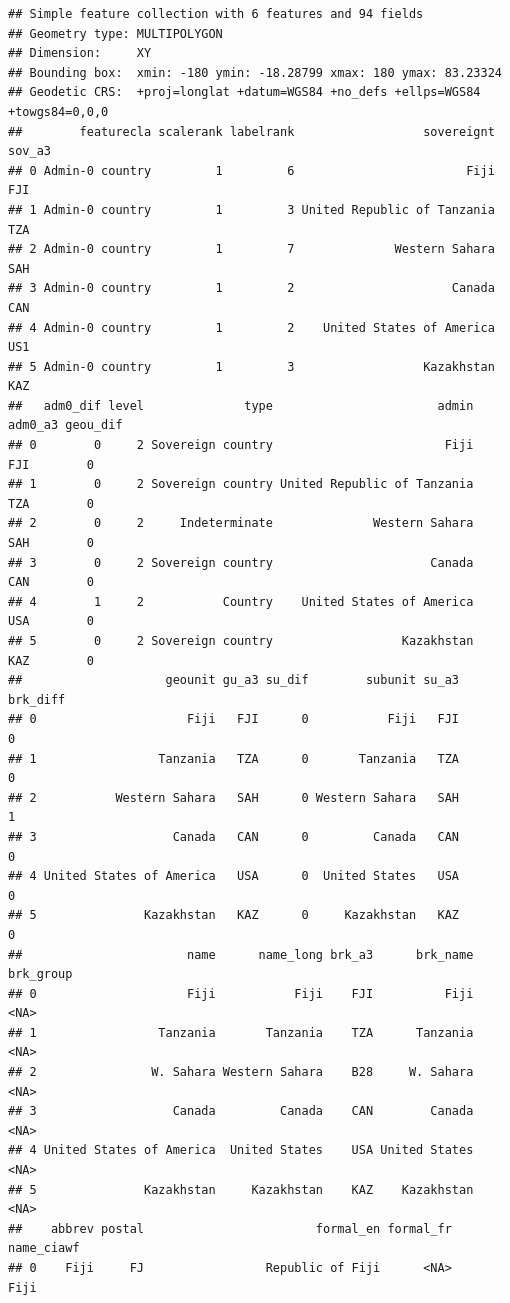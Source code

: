 \documentclass[
]{article}
\begin{document}
\begin{verbatim}
## Simple feature collection with 6 features and 94 fields
## Geometry type: MULTIPOLYGON
## Dimension:     XY
## Bounding box:  xmin: -180 ymin: -18.28799 xmax: 180 ymax: 83.23324
## Geodetic CRS:  +proj=longlat +datum=WGS84 +no_defs +ellps=WGS84 +towgs84=0,0,0
##        featurecla scalerank labelrank                  sovereignt sov_a3
## 0 Admin-0 country         1         6                        Fiji    FJI
## 1 Admin-0 country         1         3 United Republic of Tanzania    TZA
## 2 Admin-0 country         1         7              Western Sahara    SAH
## 3 Admin-0 country         1         2                      Canada    CAN
## 4 Admin-0 country         1         2    United States of America    US1
## 5 Admin-0 country         1         3                  Kazakhstan    KAZ
##   adm0_dif level              type                       admin adm0_a3 geou_dif
## 0        0     2 Sovereign country                        Fiji     FJI        0
## 1        0     2 Sovereign country United Republic of Tanzania     TZA        0
## 2        0     2     Indeterminate              Western Sahara     SAH        0
## 3        0     2 Sovereign country                      Canada     CAN        0
## 4        1     2           Country    United States of America     USA        0
## 5        0     2 Sovereign country                  Kazakhstan     KAZ        0
##                    geounit gu_a3 su_dif        subunit su_a3 brk_diff
## 0                     Fiji   FJI      0           Fiji   FJI        0
## 1                 Tanzania   TZA      0       Tanzania   TZA        0
## 2           Western Sahara   SAH      0 Western Sahara   SAH        1
## 3                   Canada   CAN      0         Canada   CAN        0
## 4 United States of America   USA      0  United States   USA        0
## 5               Kazakhstan   KAZ      0     Kazakhstan   KAZ        0
##                       name      name_long brk_a3      brk_name brk_group
## 0                     Fiji           Fiji    FJI          Fiji      <NA>
## 1                 Tanzania       Tanzania    TZA      Tanzania      <NA>
## 2                W. Sahara Western Sahara    B28     W. Sahara      <NA>
## 3                   Canada         Canada    CAN        Canada      <NA>
## 4 United States of America  United States    USA United States      <NA>
## 5               Kazakhstan     Kazakhstan    KAZ    Kazakhstan      <NA>
##    abbrev postal                        formal_en formal_fr     name_ciawf
## 0    Fiji     FJ                 Republic of Fiji      <NA>           Fiji

\end{verbatim}
\end{document}
